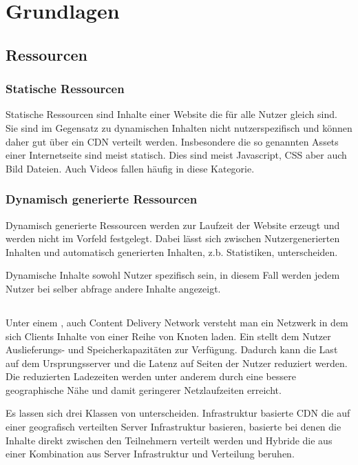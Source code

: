 \chapter{Grundlagen}\label{ch:related_work}

\section{Ressourcen}
\subsection{Statische Ressourcen}
Statische Ressourcen sind Inhalte einer Website die für alle Nutzer gleich sind. Sie sind im Gegensatz zu dynamischen Inhalten nicht nutzerspezifisch und können daher gut über ein CDN verteilt werden. Insbesondere die so genannten Assets einer Internetseite sind meist statisch. Dies sind meist Javascript, CSS aber auch Bild Dateien. Auch Videos fallen häufig in diese Kategorie.

\subsection{Dynamisch generierte Ressourcen}

Dynamisch generierte Ressourcen werden zur Laufzeit der Website erzeugt und werden nicht im Vorfeld festgelegt. Dabei lässt sich zwischen Nutzergenerierten Inhalten und automatisch generierten Inhalten, z.b. Statistiken, unterscheiden.

Dynamische Inhalte sowohl Nutzer spezifisch sein, in diesem Fall werden jedem Nutzer bei selber abfrage andere Inhalte angezeigt.

\section{\cdn}
Unter einem \cdn, auch Content Delivery Network versteht man ein Netzwerk in dem sich Clients Inhalte von einer Reihe von Knoten laden. Ein \cdn stellt dem Nutzer Auslieferungs- und Speicherkapazitäten zur Verfügung. Dadurch kann die Last auf dem Ursprungsserver und die Latenz auf Seiten der Nutzer reduziert werden. Die reduzierten Ladezeiten werden unter anderem durch eine bessere geographische Nähe und damit geringerer Netzlaufzeiten erreicht. %

Es lassen sich drei Klassen von \cdns unterscheiden. Infrastruktur basierte CDN die auf einer geografisch verteilten Server Infrastruktur basieren, \pTp basierte \cdns bei denen die Inhalte direkt zwischen den Teilnehmern verteilt werden und Hybride \cdns die aus einer Kombination aus Server Infrastruktur und \pTp Verteilung beruhen.

